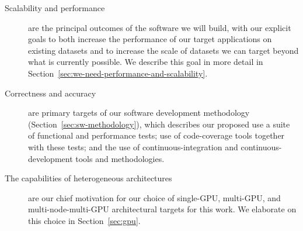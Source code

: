 \begin{description}
  \item[Scalability and performance] are the principal outcomes of the software we will build, with our explicit goals to both increase the performance of our target applications on existing datasets and to increase the scale of datasets we can target beyond what is currently possible. We describe this goal in more detail in Section~\ref{sec:we-need-performance-and-scalability}. 

  \item[Correctness and accuracy] are primary targets of our software development methodology (Section~\ref{sec:sw-methodology}), which describes our proposed use a suite of functional and performance tests; use of code-coverage tools together with these tests; and the use of continuous-integration and continuous-development tools and methodologies.

  \item[The capabilities of heterogeneous architectures] are our chief motivation for our choice of single-GPU, multi-GPU, and multi-node-multi-GPU architectural targets for this work. We elaborate on this choice in Section~\ref{sec:gpu}.


\end{description}

